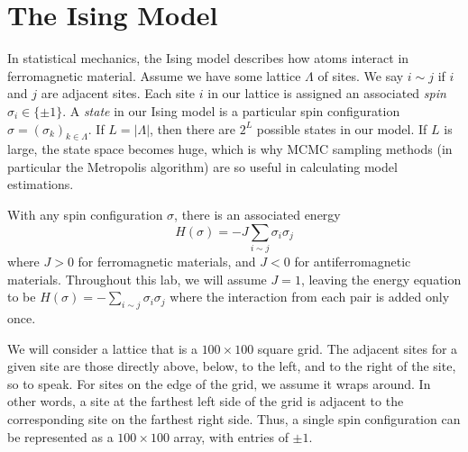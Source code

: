 \begin{comment}
\begin{figure}[h]
\centering
\texttt{[image: logprobs.pdf]}
\caption{Log probabilities of our samples.}
\end{figure}

From this we can see that after between $300$ and $500$ iterations, we had converged to the correct distribution. We can visualize the path of our sampler by plotting the samples themselves:
\begin{figure}[h]
\centering
\texttt{[image: samples.pdf]}
\caption{Samples from the Metropolis algorithm.}
\end{figure}

\begin{problem}
Using $\mu$ and $\Sigma$ as defined previously and using an initial state $\mathbf{x} = \left[ \begin{array}{cc} 1000 & -1000 \end{array} \right]$ run your Metropolis sampler for $10000$ iterations. Plot the log probs as well as the samples. How long did it take to converge?
\end{problem}
\end{comment}


\section*{The Ising Model}
In statistical mechanics, the Ising model describes how atoms interact in ferromagnetic material. Assume we have some lattice $\Lambda$ of sites. We say $i \sim j$ if $i$ and $j$ are adjacent sites. Each site $i$ in our lattice is assigned an associated \emph{spin} $\sigma_{i} \in \{\pm 1\}$. A \emph{state} in our Ising model is a particular spin configuration $\sigma = (\sigma_{k})_{k \in \Lambda}$. If $L = |\Lambda|$, then there are $2^{L}$ possible states in our model. If $L$ is large, the state space becomes huge, which is why MCMC sampling methods (in particular the Metropolis algorithm) are so useful in calculating model estimations.

With any spin configuration $\sigma$, there is an associated energy
\[
H(\sigma) = -J \sum_{i \sim j} \sigma_{i} \sigma_{j}
\]
 where $J > 0$ for ferromagnetic materials, and $J < 0$ for antiferromagnetic materials. Throughout this lab, we will assume $J = 1$, leaving the energy equation to be $H(\sigma) = -\sum_{i \sim j} \sigma_{i}\sigma_{j}$ where the interaction from each pair is added only once.

We will consider a lattice that is a $100 \times 100$ square grid. The adjacent sites for a given site are those directly above, below, to the left, and to the right of the site, so to speak. For sites on the edge of the grid, we assume it wraps around. In other words, a site at the farthest left side of the grid is adjacent to the corresponding site on the farthest right side. Thus, a single spin configuration can be represented as a $100 \times 100$ array, with entries of $\pm 1$.

